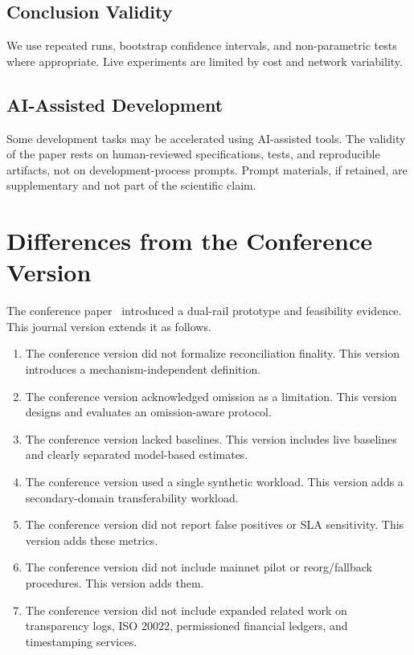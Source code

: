 \documentclass[journal]{IEEEtran}
\begin{document}
\subsection{Conclusion Validity}
We use repeated runs, bootstrap confidence intervals, and non-parametric tests where appropriate. Live experiments are limited by cost and network variability.

\subsection{AI-Assisted Development}
Some development tasks may be accelerated using AI-assisted tools. The validity of the paper rests on human-reviewed specifications, tests, and reproducible artifacts, not on development-process prompts. Prompt materials, if retained, are supplementary and not part of the scientific claim.

\section{Differences from the Conference Version}
\label{sec:diff}

The conference paper~\cite{le2026ssc} introduced a dual-rail prototype and feasibility evidence. This journal version extends it as follows.

\begin{enumerate}[nosep,leftmargin=2em]
    \item The conference version did not formalize reconciliation finality. This version introduces a mechanism-independent definition.
    \item The conference version acknowledged omission as a limitation. This version designs and evaluates an omission-aware protocol.
    \item The conference version lacked baselines. This version includes live baselines and clearly separated model-based estimates.
    \item The conference version used a single synthetic workload. This version adds a secondary-domain transferability workload.
    \item The conference version did not report false positives or SLA sensitivity. This version adds these metrics.
    \item The conference version did not include mainnet pilot or reorg/fallback procedures. This version adds them.
    \item The conference version did not include expanded related work on transparency logs, ISO 20022, permissioned financial ledgers, and timestamping services.
\end{enumerate}
\end{document}
